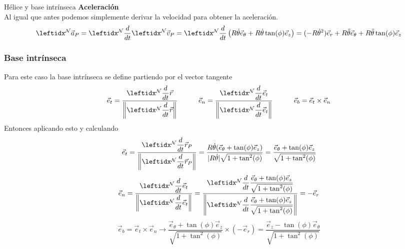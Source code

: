 \begin{solucion}{Hélice y base intrínseca}
\textbf{Aceleración}\\
Al igual que antes podemos simplemente derivar la velocidad para obtener la aceleración.
$$\marc{\vec{a}_P}{N}=\der{\marc{\vec{v}_P}{N}{}}{N}{}=\der{\left(R\dot\theta\vec{e}_\theta+R\dot\theta\tan(\phi)\vec{e}_z\right)}{N}{}=(-R\dot\theta^2)\vec{e}_r+ R\ddot\theta\vec{e}_{\theta}+R\ddot\theta\tan(\phi)\vec{e}_z$$

\subsubsection*{Base intrínseca}
Para este caso la base intrínseca se define partiendo por el vector tangente
$$\vec{e}_t=\dfrac{\der{\vec{r}}{N}}{\left\|\der{\vec{r}}{N}\right\|}\quad\quad\quad\vec{e}_n=\dfrac{\der{\vec{e}_t}{N}}{\left\|\der{\vec{e}_t}{N}\right\|}\quad\quad\quad\vec{e}_{b}=\vec{e}_t\times\vec{e}_n$$
Entonces aplicando esto y calculando
$$\vec{e}_t=\dfrac{\der{\vec{r}_P}{N}}{\left\|\der{\vec{r}_P}{N}\right\|}=\dfrac{R\dot\theta(\vec{e}_\theta+\tan(\phi)\vec{e}_z)}{|R\dot\theta|\sqrt{1+\tan^2(\phi)}}=\dfrac{\vec{e}_\theta+\tan(\phi)\vec{e}_z}{\sqrt{1+\tan^2(\phi)}}$$
$$\vec{e}_n=\dfrac{\der{\vec{e}_t}{N}}{\left\|\der{\vec{e}_t}{N}\right\|}=\dfrac{\der{}{N}\dfrac{\vec{e}_\theta+\tan(\phi)\vec{e}_z}{\sqrt{1+\tan^2(\phi)}}}{\left\|\der{}{N}\dfrac{\vec{e}_\theta+\tan(\phi)\vec{e}_z}{\sqrt{1+\tan^2(\phi)}} \right\|}=-\vec{e}_r$$
$$\vec{e}_{b}=\vec{e}_t\times\vec{e}_n\longrightarrow\dfrac{\vec{e}_\theta+\tan(\phi)\vec{e}_z}{\sqrt{1+\tan^2(\phi)}}\times (-\vec{e}_r)=\dfrac{\vec{e}_z-\tan(\phi)\vec{e}_\theta}{\sqrt{1+\tan^2(\phi)}}$$


\end{solucion}
